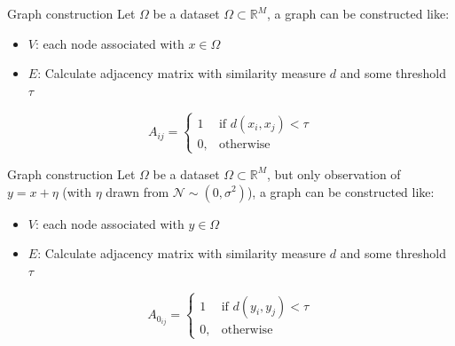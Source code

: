 \documentclass[aspectratio=169]{beamer}
\begin{document}
\begin{frame}{Graph construction}
    Let $\Omega$ be a dataset $\Omega \subset \mathbb{R}^M$, a graph can be constructed like:
    \begin{itemize}
        \item $V$: each node associated with $x \in \Omega$
        \item $E$: Calculate adjacency matrix with similarity measure $d$ and some threshold $\tau$
     \end{itemize}

     \begin{definition}
        \begin{equation}
            \label{eq:graphConstruction}
            A_{ij} =    
            \begin{cases}
                1  & \text{if } d(x_i, x_j) < \tau\\
                0, & \text{otherwise}
            \end{cases}
        \end{equation}
    \end{definition}
\end{frame}

\begin{frame}{Graph construction}
    Let $\Omega$ be a dataset $\Omega \subset \mathbb{R}^M$, but only observation 
    of $y = x + \eta$ (with $\eta$ drawn from $\mathcal{N} \sim (0, \sigma^2)$), 
    a graph can be constructed like:
    \begin{itemize}
        \item $V$: each node associated with $y \in \Omega$
        \item $E$: Calculate adjacency matrix with similarity measure $d$ and some threshold $\tau$
     \end{itemize}
     \begin{definition}
        \begin{equation}
            \label{eq:graphConstructionNoise}
            A_{0_{ij}} =    
            \begin{cases}
                1  & \text{if } d(y_i, y_j) < \tau\\
                0, & \text{otherwise}
            \end{cases}
        \end{equation}    
     \end{definition}
\end{frame}
\end{document}
